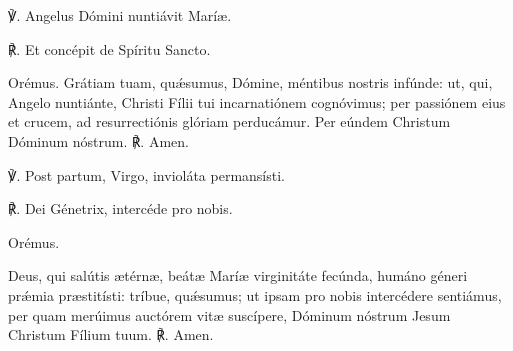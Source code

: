 ℣. Angelus Dómini nuntiávit Maríæ.

℟. Et concépit de Spíritu Sancto.

Orémus. 
Grátiam tuam, quǽsumus, Dómine, méntibus nostris infúnde: ut, qui, Angelo nuntiánte, Christi Fílii tui incarnatiónem cognóvimus; per passiónem eius et crucem, ad resurrectiónis glóriam perducámur. Per eúndem Christum Dóminum nóstrum.  ℟. Amen.

℣. Post partum, Virgo, invioláta permansísti.

℟. Dei Génetrix, intercéde pro nobis.

Orémus.

Deus, qui salútis ætérnæ, beátæ Maríæ virginitáte fecúnda, humáno géneri prǽmia præstitísti: tríbue, quǽsumus; ut ipsam pro nobis intercédere sentiámus, per quam merúimus auctórem vitæ suscípere, Dóminum nóstrum Jesum Christum Fílium tuum. ℟. Amen.